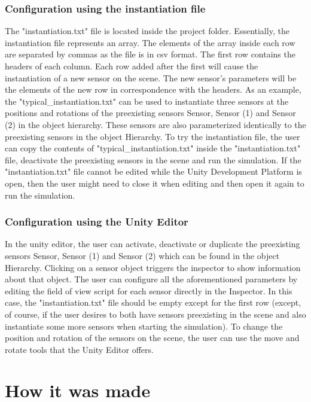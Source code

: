 \documentclass{article}
\begin{document}
\subsubsection{Configuration using the instantiation file}

The "instantiation.txt" file is located inside the project folder. Essentially, the instantiation file represents an array. The elements of the array inside each row are separated by commas as the file is in csv format. The first row contains the headers of each column. Each row added after the first will cause the instantiation of a new sensor on the scene. The new sensor's parameters will be the elements of the new row in correspondence with the headers. As an example, the "typical\_instantiation.txt" can be used to instantiate three sensors at the positions and rotations of the preexisting sensors  Sensor, Sensor (1) and Sensor (2) in the object hierarchy. These sensors are also parameterized identically to the preexisting sensors in the object Hierarchy. To try the instantiation file, the user can copy the contents of "typical\_instantiation.txt" inside the "instantiation.txt" file, deactivate the preexisting sensors in the scene and run the simulation. If the "instantiation.txt" file cannot be edited while the Unity Development Platform is open, then the user might need to close it when editing and then open it again to run the simulation. 


\subsubsection{Configuration using the Unity Editor}

In the unity editor, the user can activate, deactivate or duplicate the preexisting sensors Sensor, Sensor (1) and Sensor (2) which can be found in the object Hierarchy. Clicking on a sensor object triggers the inspector to show information about that object. The user can configure all the aforementioned parameters by editing the field of view script for each sensor directly in the Inspector. In this case, the "instantiation.txt" file should be empty except for the first row (except, of course, if the user desires to both have sensors preexisting in the scene and also instantiate some more sensors when starting the simulation). To change the position and rotation of the sensors on the scene, the user can use the move and rotate tools that the Unity Editor offers.

\section{How it was made}
\end{document}

